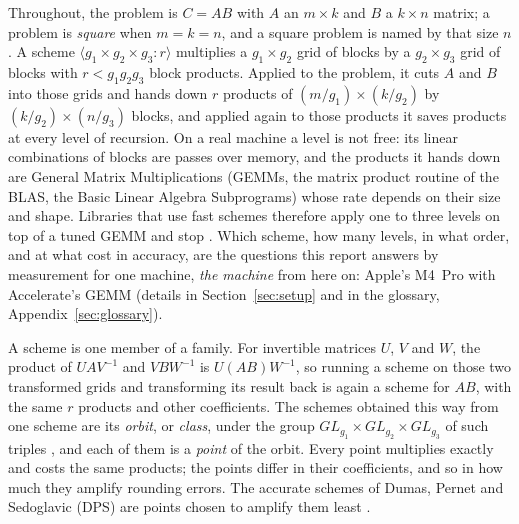 \documentclass[11pt]{article}
\newcommand{\mm}[1]{\langle #1\rangle}
\begin{document}
Throughout, the problem is $C=AB$ with $A$ an $m\times k$ and $B$ a
$k\times n$ matrix; a problem is \emph{square} when $m=k=n$, and a square
problem is named by that size $n$.  A scheme $\mm{g_1\times g_2\times g_3:r}$
multiplies a $g_1\times g_2$ grid of blocks by a $g_2\times g_3$ grid of
blocks with $r<g_1g_2g_3$ block products.  Applied to the problem, it cuts $A$
and $B$ into those grids and hands down $r$ products of
$(m/g_1)\times(k/g_2)$ by $(k/g_2)\times(n/g_3)$ blocks, and applied again to
those products it saves products at every level of recursion.  On a real
machine a level is not free: its linear combinations of blocks are passes
over memory, and the products it hands down are General Matrix
Multiplications (GEMMs, the matrix product routine of the BLAS, the Basic
Linear Algebra Subprograms) whose rate depends on their size
and shape.  Libraries that use fast schemes therefore apply one to three
levels on top of a tuned GEMM and stop \cite{HSvdG16,DPSST26}.  Which scheme, how
many levels, in what order, and at what cost in accuracy, are the questions
this report answers by measurement for one machine, \emph{the machine}
from here on: Apple's M4~Pro with Accelerate's GEMM (details in
Section~\ref{sec:setup} and in the glossary, Appendix~\ref{sec:glossary}).

A scheme is one member of a family.  For invertible matrices $U$, $V$ and
$W$, the product of $UAV^{-1}$ and $VBW^{-1}$ is $U(AB)W^{-1}$, so running a
scheme on those two transformed grids and transforming its result back is
again a scheme for $AB$, with the same $r$ products and other
coefficients.  The schemes obtained this way from one scheme are its
\emph{orbit}, or \emph{class}, under the group $GL_{g_1}\times
GL_{g_2}\times GL_{g_3}$ of such triples \cite{deGroote78}, and each of them
is a \emph{point} of the orbit.  Every point multiplies exactly and costs
the same products; the points differ in their coefficients, and so in how
much they amplify rounding errors.  The accurate schemes of Dumas, Pernet
and Sedoglavic (DPS) are points chosen to amplify them least
\cite{DPS24,DPS26a}.
\end{document}
